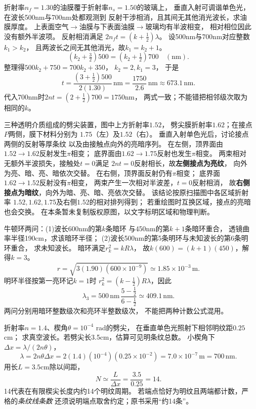 \problemtext 折射率$n_f=1.30$的油膜覆于折射率$n_s=1.50$的玻璃上，
垂直入射可调谐单色光，在波长500nm与700nm处都观测到
反射干涉相消，且其间无其他消光波长，求油膜厚度。
\workings
上表面空气$\to$油膜与下表面油膜$\to$玻璃均有半波相变，
相对相位因此没有额外半波项。
反射相消满足
$2n_ft=(k+\tfrac12)\lambda$。
设500nm与700nm对应整数$k_1>k_2$，
且两波长之间无其他消光，故$k_1=k_2+1$。
\[
( k_2+\tfrac32)500=(k_2+\tfrac12)700\quad(\mathrm{nm}).
\]
整理得$500k_2+750=700k_2+350$，
$k_2=2,k_1=3$，
于是
\[
\boxed{t=\frac{(3+\tfrac12)500}{2(1.30)}\,\mathrm{nm}
=\frac{1750}{2.6}\,\mathrm{nm}
\approx673.1\,\mathrm{nm}}.
\]
\crosscheck 代入700nm时$2nt=(2+\tfrac12)700=1750$nm，
两式一致；不能错把相邻级次取为相同的$k$。

\problemtext 三种透明介质组成的劈尖装置，图中上方折射率$1.52$，
劈尖膜折射率$1.62$；在接点$P$两侧，膜下材料分别为
$1.75$（左）及$1.52$（右）。
垂直入射单色光后，讨论接点两侧的反射等厚条纹
以及由接触点向外的亮暗序列。
\workings
在左侧，顶界面由$1.52\to1.62$反射发生$\pi$相变；
底界面由$1.62\to1.75$反射也发生$\pi$相变。
两束相对无额外半波损失，接触处$t=0$满足
$2nt=0$反射相长，故\textbf{左侧接点为亮纹}，
向外为亮、暗、亮、暗依次交替。
在右侧，顶界面反射仍有$\pi$相变；
底界面$1.62\to1.52$反射没有$\pi$相变，
两束产生一次相对半波差，$t=0$反射相消，
故\textbf{右侧接点为暗纹}，向外为暗、亮、暗、亮依次交替。
\crosscheck 该结论按原扫描图中各区域折射率
$1.52,1.62,1.75$及右侧$1.52$的相对排列得到；
若重绘图时互换区域，接点的亮暗也会交换。
在本条暂未复制版权原图，以文字标明区域和物理判断。

\problemtext 牛顿环两问：(1)波长600nm的第$k$条暗环
与450nm的第$k+1$条暗环重合，
透镜曲率半径190cm，求该暗环半径；
(2)波长500nm的第5条明环与未知波长的第6条明环重合，
求未知波长。
\workings
暗环满足$r_k^2=kR\lambda$，
故$k(600)=(k+1)(450)$，解得$k=3$。
\[
\boxed{r=\sqrt{3(1.90)(600\times10^{-9})}
\simeq1.85\times10^{-3}\,\mathrm m}.
\]
明环半径按第一亮环记$k=1$时
$r_k^2=(k-\tfrac12)R\lambda$，因此
\[
\boxed{\lambda_3
=500\,\mathrm{nm}\,\frac{5-\tfrac12}{6-\tfrac12}
\simeq409.1\,\mathrm{nm}}.
\]
\crosscheck 两问分别用暗环整数级次和亮环半整数级次，
不能把两种计数公式混用。

\problemtext 折射率$n=1.4$、楔角$\theta=10^{-4}$ rad的劈尖，
在垂直单色光照射下相邻明纹距$0.25$cm；
求真空波长。若劈尖长3.5cm，估算可见明条纹总数。
\workings
小楔角下$\Delta x=\lambda/(2n\theta)$，
\[
\boxed{\lambda=2n\theta\Delta x
=2(1.4)(10^{-4})(0.25\times10^{-2})
=7.0\times10^{-7}\,\mathrm m=700\,\mathrm{nm}}.
\]
用长$L=3.5$cm除以间距，
\[
\boxed{N\simeq\frac{L}{\Delta x}
=\frac{3.5}{0.25}=14}.
\]
\crosscheck 14代表在有限楔尖长度内约14个明纹周期。
若端点恰好为明纹且两端都计数，严格的\emph{条纹线条数}
还须说明端点取舍约定；原书采用“约14条”。
